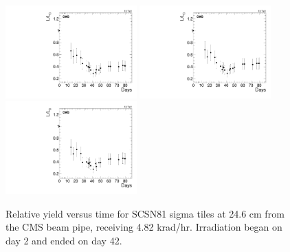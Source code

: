 \begin{figure}[tbp!]
\centering
\includegraphics[width=0.45\textwidth]{figures/SCSN81-S-24p6cm-f3ch2-time.pdf}
\includegraphics[width=0.45\textwidth]{figures/SCSN81-S-24p6cm-f14ch4-time.pdf}
\includegraphics[width=0.45\textwidth]{figures/SCSN81-S-24p6cm-f15ch4-time.pdf}
\caption{Relative yield versus time for SCSN81 sigma tiles at 24.6 cm from the CMS beam pipe, receiving 4.82 krad/hr. Irradiation began on day 2 and ended on day 42.}
\label{fig:SCSN81-S-24p6cm-time}
\end{figure} 

